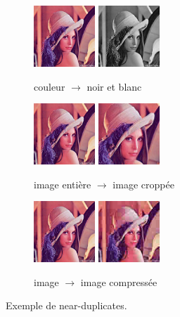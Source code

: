 \documentclass[utf8,final]{stageM2R} %
\begin{document}
\begin{center}
  \begin{figure}[H]
    \begin{subfigure}{.33\textwidth}
      \centering
      \includegraphics[width=23mm]{images/lena_base.jpg} \includegraphics[width=23mm]{images/lena_bw.jpg}
      \caption{couleur $\to$ noir et blanc}
      \label{lena-bw}
    \end{subfigure}
    \begin{subfigure}{.33\textwidth}
      \centering
      \includegraphics[width=23mm]{images/lena_base.jpg} \includegraphics[width=23mm]{images/lena_crop.jpg}
      \caption{image entière $\to$ image croppée}
      \label{lena-crop}
    \end{subfigure}
    \begin{subfigure}{.33\textwidth}
      \centering
      \includegraphics[width=23mm]{images/lena_base.jpg} \includegraphics[width=23mm]{images/lena_comp.jpg}
      \caption{image $\to$ image compressée}
      \label{lena-comp}
    \end{subfigure}
    \caption{Exemple de near-duplicates.}
    \label{fig:near-duplicates-images}
  \end{figure}
\end{center}
\end{document}
